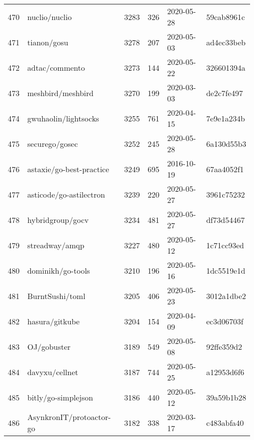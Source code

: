 \begin{footnotesize}
\begin{longtable}{llrrll}
        470 &                                      nuclio/nuclio &   3283 &    326 & 2020-05-28 &  59cab8961c \\
        471 &                                        tianon/gosu &   3278 &    207 & 2020-05-03 &  ad4ec33beb \\
        472 &                                     adtac/commento &   3273 &    144 & 2020-05-22 &  326601394a \\
        473 &                                  meshbird/meshbird &   3270 &    199 & 2020-03-03 &  de2c7fe497 \\
        474 &                               gwuhaolin/lightsocks &   3255 &    761 & 2020-04-15 &  7e9e1a234b \\
        475 &                                     securego/gosec &   3252 &    245 & 2020-05-28 &  6a130d55b3 \\
        476 &                           astaxie/go-best-practice &   3249 &    695 & 2016-10-19 &  67aa4052f1 \\
        477 &                            asticode/go-astilectron &   3239 &    220 & 2020-05-27 &  3961c75232 \\
        478 &                                   hybridgroup/gocv &   3234 &    481 & 2020-05-27 &  df73d54467 \\
        479 &                                     streadway/amqp &   3227 &    480 & 2020-05-12 &  1c71cc93ed \\
        480 &                                  dominikh/go-tools &   3210 &    196 & 2020-05-16 &  1dc5519e1d \\
        481 &                                    BurntSushi/toml &   3205 &    406 & 2020-05-23 &  3012a1dbe2 \\
        482 &                                     hasura/gitkube &   3204 &    154 & 2020-04-09 &  ec3d06703f \\
        483 &                                        OJ/gobuster &   3189 &    549 & 2020-05-08 &  92ffe359d2 \\
        484 &                                     davyxu/cellnet &   3187 &    744 & 2020-05-25 &  a12953d6f6 \\
        485 &                                bitly/go-simplejson &   3186 &    440 & 2020-05-12 &  39a59b1b28 \\
        486 &                           AsynkronIT/protoactor-go &   3182 &    338 & 2020-03-17 &  c483abfa40 \\

\end{longtable}
\end{footnotesize}
